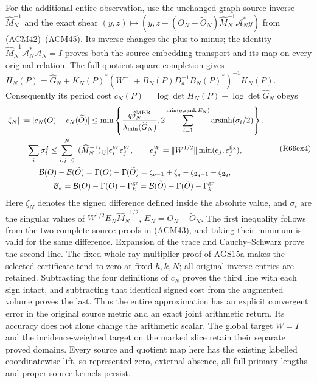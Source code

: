 For the additional entire observation, use the unchanged
graph source inverse $\widehat M_N^{-1}$ and the exact shear
$(y,z)\mapsto(y,z+(O_N-\widetilde O_N)
\widehat M_N^{-1}\mathcal A_N^*y)$ from (ACM42)--(ACM45).
Its inverse changes the plus to minus; the identity
$\widehat M_N^{-1}\mathcal A_N^*\mathcal A_N=I$ proves both
the source embedding transport and its map on every original
relation. The full quotient square completion gives
$H_N(P)=\widehat G_N+K_N(P)^*
(W^{-1}+B_N(P)D_a^{-1}B_N(P)^*)^{-1}K_N(P)$.
Consequently its period cost
$c_N(P)=\log\det H_N(P)-\log\det\widehat G_N$ obeys
\[
\begin{gathered}
 |\zeta_N|:=|c_N(O)-c_N(\widetilde O)|
 \leq\min\left\{
 \frac{q\delta_N^{\rm MBR}}{\lambda_{\min}(\widehat G_N)},
 2\sum_{i=1}^{\min(q,\operatorname{rank}E_N)}
                       \operatorname{arsinh}(\sigma_i/2)\right\},\\
 \sum_i\sigma_i^2\leq
 \sum_{i,j=0}^N|(\widehat M_N^{-1})_{ij}|e_i^We_j^W,\qquad
 e_j^W=\|W^{1/2}\|\min(e_j,e_j^{\rm fix}),\\
 \mathcal B(O)-\mathcal B(\widetilde O)
 =\Gamma(O)-\Gamma(\widetilde O)
 =\zeta_{q-1}+\zeta_q-\zeta_{2q-1}-\zeta_{2q},\\
 \mathcal B_k=\mathcal B(O)-\Gamma(O)-\Gamma_k^{\rm gr}
 =\mathcal B(\widetilde O)-\Gamma(\widetilde O)-\Gamma_k^{\rm gr}.
\end{gathered}\tag{R66ex4}
\]
Here $\zeta_N$ denotes the signed difference defined inside the
absolute value, and $\sigma_i$ are the singular values of
$W^{1/2}E_N\widehat M_N^{-1/2}$, $E_N=O_N-\widetilde O_N$.
The first inequality follows from the two complete source
proofs in (ACM43), and taking their minimum is valid for the
same difference. Expansion of the trace and Cauchy--Schwarz
prove the second line. The fixed-whole-ray multiplier proof
of AGS15a makes the selected certificate tend to zero at
fixed $h,k,N$; all original inverse entries are retained.
Subtracting the four definitions of $c_N$ proves the third
line with each sign intact, and subtracting that identical
signed cost from the augmented volume proves the last.
Thus the entire approximation has an explicit convergent error
in the original source metric and an exact joint arithmetic
return. Its accuracy does not alone change the arithmetic scalar.
The global target $W=I$ and the incidence-weighted target on
the marked slice retain their separate proved domains.
Every source and quotient map here has the existing labelled
coordinatewise lift, so represented zero, external absence,
all full primary lengths and proper-source kernels persist.

